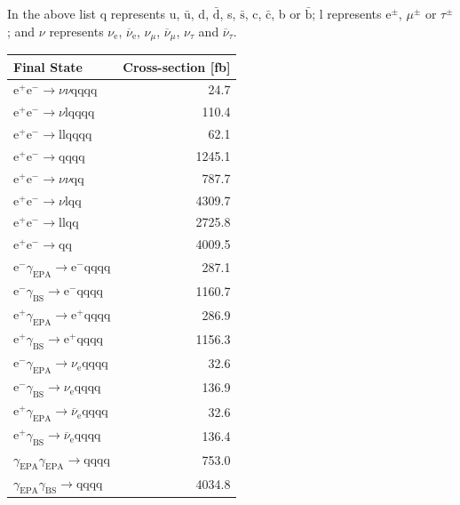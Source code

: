 %
\noindent In the above list q represents u, $\bar{\text{u}}$, d, $\bar{\text{d}}$, s, $\bar{\text{s}}$, c, $\bar{\text{c}}$, b or $\bar{\text{b}}$;  l represents $\text{e}^{\pm}$, $\mu^{\pm}$ or $\tau^{\pm}$; and $\nu$ represents $\nu_{\text{e}}$, $\overline{\nu}_{\text{e}}$, $\nu_{\mu}$, $\overline{\nu}_{\mu}$, $\nu_{\tau}$ and $\overline{\nu}_{\tau}$.
%
\begin{table}[h!]
\centering
\begin{tabular}{ l r }
\hline
Final State & Cross-section [fb] \\ 
\hline
$\text{e}^{+}\text{e}^{-} \rightarrow \nu{\nu}\text{qqqq}$ & 24.7 \\
$\text{e}^{+}\text{e}^{-} \rightarrow \nu\text{lqqqq}$ & 110.4\\
$\text{e}^{+}\text{e}^{-} \rightarrow \text{llqqqq}$ & 62.1\\
$\text{e}^{+}\text{e}^{-} \rightarrow \text{qqqq}$ & 1245.1\\
$\text{e}^{+}\text{e}^{-} \rightarrow \nu{\nu}\text{qq}$ & 787.7\\
$\text{e}^{+}\text{e}^{-} \rightarrow \nu\text{lqq}$ & 4309.7\\
$\text{e}^{+}\text{e}^{-} \rightarrow \text{llqq}$ & 2725.8\\
$\text{e}^{+}\text{e}^{-} \rightarrow \text{qq}$ & 4009.5\\
$\text{e}^{-}\gamma_{\text{EPA}} \rightarrow \text{e}^{-}\text{qqqq}$ & 287.1\\
$\text{e}^{-}\gamma_{\text{BS}} \rightarrow \text{e}^{-}\text{qqqq}$ & 1160.7\\
$\text{e}^{+}\gamma_{\text{EPA}} \rightarrow \text{e}^{+}\text{qqqq}$ & 286.9\\
$\text{e}^{+}\gamma_{\text{BS}} \rightarrow \text{e}^{+}\text{qqqq}$ & 1156.3\\
$\text{e}^{-}\gamma_{\text{EPA}} \rightarrow \nu_{\text{e}}\text{qqqq}$ & 32.6\\
$\text{e}^{-}\gamma_{\text{BS}} \rightarrow \nu_{\text{e}}\text{qqqq}$ & 136.9\\
$\text{e}^{+}\gamma_{\text{EPA}} \rightarrow \overline{\nu}_{\text{e}}\text{qqqq}$ & 32.6\\
$\text{e}^{+}\gamma_{\text{BS}} \rightarrow \overline{\nu}_{\text{e}}\text{qqqq}$ & 136.4\\
$\gamma_{\text{EPA}}\gamma_{\text{EPA}} \rightarrow \text{qqqq}$ & 753.0\\
$\gamma_{\text{EPA}}\gamma_{\text{BS}} \rightarrow \text{qqqq}$ & 4034.8\\

\end{tabular}
\end{table}
